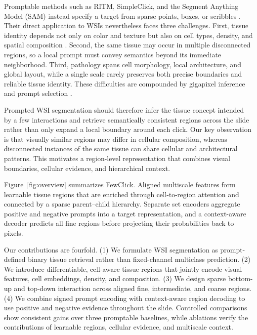 \documentclass[letterpaper]{article}
\begin{document}
Promptable methods such as RITM, SimpleClick, and the Segment Anything Model (SAM) instead specify a target from sparse points, boxes, or scribbles \cite{sofiiuk2022ritm,liu2023simpleclick,kirillov2023sam}. Their direct application to WSIs nevertheless faces three challenges. First, tissue identity depends not only on color and texture but also on cell types, density, and spatial composition \cite{graham2019hovernet,horst2024cellvit}. Second, the same tissue may occur in multiple disconnected regions, so a local prompt must convey semantics beyond its immediate neighborhood. Third, pathology spans cell morphology, local architecture, and global layout, while a single scale rarely preserves both precise boundaries and reliable tissue identity. These difficulties are compounded by gigapixel inference and prompt selection \cite{deng2023sam_pathology,liu2024wsisam}.

Prompted WSI segmentation should therefore infer the tissue concept intended by a few interactions and retrieve semantically consistent regions across the slide rather than only expand a local boundary around each click. Our key observation is that visually similar regions may differ in cellular composition, whereas disconnected instances of the same tissue can share cellular and architectural patterns. This motivates a region-level representation that combines visual boundaries, cellular evidence, and hierarchical context.

Figure~\ref{fig:overview} summarizes FewClick. Aligned multiscale features form learnable tissue regions that are enriched through cell-to-region attention and connected by a sparse parent--child hierarchy. Separate set encoders aggregate positive and negative prompts into a target representation, and a context-aware decoder predicts all fine regions before projecting their probabilities back to pixels.

Our contributions are fourfold. (1) We formulate WSI segmentation as prompt-defined binary tissue retrieval rather than fixed-channel multiclass prediction. (2) We introduce differentiable, cell-aware tissue regions that jointly encode visual features, cell embeddings, density, and composition. (3) We design sparse bottom-up and top-down interaction across aligned fine, intermediate, and coarse regions. (4) We combine signed prompt encoding with context-aware region decoding to use positive and negative evidence throughout the slide. Controlled comparisons show consistent gains over three promptable baselines, while ablations verify the contributions of learnable regions, cellular evidence, and multiscale context.
\end{document}
